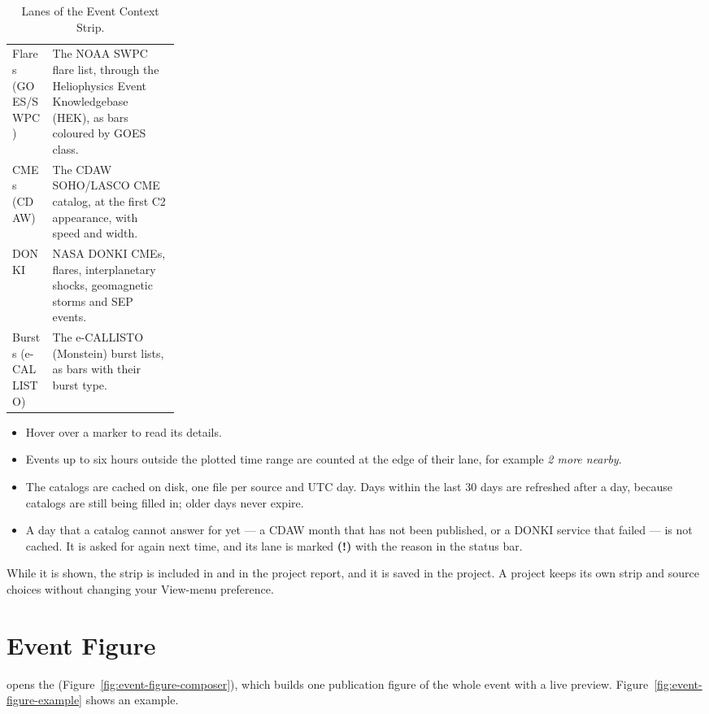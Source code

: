 \begin{table}[!htbp]
  \centering
  \caption{Lanes of the Event Context Strip.}
  \label{tab:event-lanes}
  \small
  \begin{tabularx}{\linewidth}{@{}P{0.24\linewidth}L@{}}
    \toprule
     &  \\
    \midrule
    Flares (GOES/SWPC) & The NOAA SWPC flare list, through the Heliophysics Event Knowledgebase (HEK), as bars coloured by GOES class. \\
    CMEs (CDAW) & The CDAW SOHO/LASCO CME catalog, at the first C2 appearance, with speed and width. \\
    DONKI & NASA DONKI CMEs, flares, interplanetary shocks, geomagnetic storms and SEP events. \\
    Bursts (e-CALLISTO) & The e-CALLISTO (Monstein) burst lists, as bars with their burst type. \\
    \bottomrule
  \end{tabularx}
\end{table}

\begin{itemize}
  \item Hover over a marker to read its details.
  \item Events up to six hours outside the plotted time range are counted at the edge of their
    lane, for example \emph{2 more nearby}.
  \item The catalogs are cached on disk, one file per source and UTC day. Days within the last 30
    days are refreshed after a day, because catalogs are still being filled in; older days never
    expire.
  \item A day that a catalog cannot answer for yet --- a CDAW month that has not been published,
    or a DONKI service that failed --- is not cached. It is asked for again next time, and its
    lane is marked \textbf{(!)} with the reason in the status bar.
\end{itemize}
While it is shown, the strip is included in  and in the project report, and
it is saved in the project. A project keeps its own strip and source choices without changing
your View-menu preference.

\section{Event Figure}
\label{sec:event-figure}

 opens the 
(Figure~\ref{fig:event-figure-composer}), which builds one publication figure of the whole
event with a live preview. Figure~\ref{fig:event-figure-example} shows an example.

